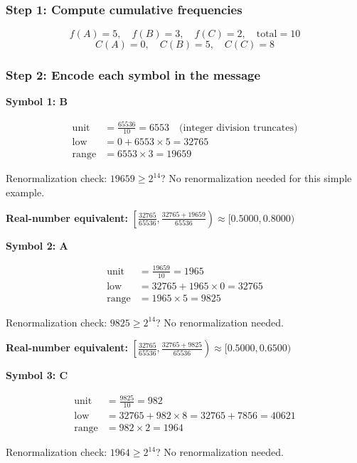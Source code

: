 \documentclass[12pt]{article}
\begin{document}
\subsubsection*{Step 1: Compute cumulative frequencies}
\[
f(A)=5,\quad f(B)=3,\quad f(C)=2,\quad \text{total}=10
\]
\[
C(A)=0,\quad C(B)=5,\quad C(C)=8
\]

\subsubsection*{Step 2: Encode each symbol in the message}

\textbf{Symbol 1: B}

\begin{align*}
\text{unit} &= \frac{65536}{10} = 6553 \quad \text{(integer division truncates)} \\
\text{low} &= 0 + 6553 \times 5 = 32765 \\
\text{range} &= 6553 \times 3 = 19659
\end{align*}

Renormalization check: $19659 \ge 2^{14}$? No renormalization needed for this simple example.

\textbf{Real-number equivalent:} $\left[\frac{32765}{65536}, \frac{32765+19659}{65536}\right) \approx [0.5000, 0.8000)$

\vspace{2mm}
\textbf{Symbol 2: A}

\begin{align*}
\text{unit} &= \frac{19659}{10} = 1965 \\
\text{low} &= 32765 + 1965 \times 0 = 32765 \\
\text{range} &= 1965 \times 5 = 9825
\end{align*}

Renormalization check: $9825 \ge 2^{14}$? No renormalization needed.

\textbf{Real-number equivalent:} $\left[\frac{32765}{65536}, \frac{32765+9825}{65536}\right) \approx [0.5000, 0.6500)$

\vspace{2mm}
\textbf{Symbol 3: C}

\begin{align*}
\text{unit} &= \frac{9825}{10} = 982 \\
\text{low} &= 32765 + 982 \times 8 = 32765 + 7856 = 40621 \\
\text{range} &= 982 \times 2 = 1964
\end{align*}

Renormalization check: $1964 \ge 2^{14}$? No renormalization needed.
\end{document}
